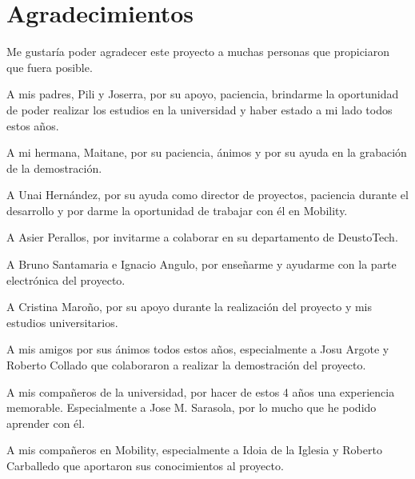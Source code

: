 \chapter*{Agradecimientos}
Me gustaría poder agradecer este proyecto a muchas personas que propiciaron
que fuera posible.

A mis padres, Pili y Joserra, por su apoyo, paciencia, brindarme la oportunidad
de poder realizar los estudios en la universidad y haber estado a mi lado
todos estos años.

A mi hermana, Maitane, por su paciencia, ánimos y por su ayuda en la grabación
de la demostración.

A Unai Hernández, por su ayuda como director de proyectos, paciencia durante
el desarrollo y por darme la oportunidad de trabajar con él en Mobility.

A Asier Perallos, por invitarme a colaborar en su departamento de DeustoTech.

A Bruno Santamaria e Ignacio Angulo, por enseñarme y ayudarme con la parte
electrónica del proyecto.

A Cristina Maroño, por su apoyo durante la realización del proyecto y mis
estudios universitarios.

A mis amigos por sus ánimos todos estos años, especialmente a Josu Argote y
Roberto Collado que colaboraron a realizar la demostración del proyecto.

A mis compañeros de la universidad, por hacer de estos 4 años una experiencia
memorable. Especialmente a Jose M. Sarasola, por lo mucho que he podido
aprender con él.

A mis compañeros en Mobility, especialmente a Idoia de la Iglesia y Roberto
Carballedo que aportaron sus conocimientos al proyecto.
